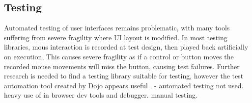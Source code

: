 \subsection{Testing}
Automated testing of user interfaces remains problematic, with many tools suffering from severe fragility where UI layout is modified. In most testing libraries, mous interaction is recorded at test design, then played back artificially on execution, This causes severe fragility as if a control or button moves the recorded mouse movements will miss the button, causing test failures. Further research is needed to find a testing library suitable for testing, however the test automation tool created by Dojo appears useful \cite{dojo2013test}. - automated testing not used. heavy use of in browser dev tools and debugger. manual testing. 

\begin{figure}[tbh]
\end{figure}
